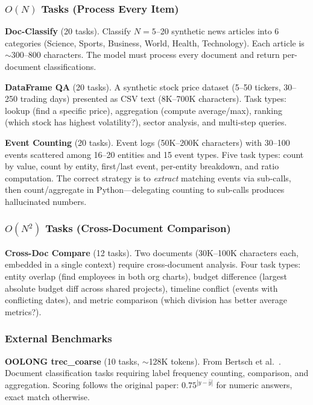 \documentclass{article}
\begin{document}
\subsubsection{$O(N)$ Tasks (Process Every Item)}

\textbf{Doc-Classify} (20 tasks). Classify $N{=}5$--20 synthetic news articles into 6 categories (Science, Sports, Business, World, Health, Technology). Each article is $\sim$300--800 characters. The model must process every document and return per-document classifications.

\textbf{DataFrame QA} (20 tasks). A synthetic stock price dataset (5--50 tickers, 30--250 trading days) presented as CSV text (8K--700K characters). Task types: lookup (find a specific price), aggregation (compute average/max), ranking (which stock has highest volatility?), sector analysis, and multi-step queries.

\textbf{Event Counting} (20 tasks). Event logs (50K--200K characters) with 30--100 events scattered among 16--20 entities and 15 event types. Five task types: count by value, count by entity, first/last event, per-entity breakdown, and ratio computation. The correct strategy is to \emph{extract} matching events via sub-calls, then count/aggregate in Python---delegating counting to sub-calls produces hallucinated numbers.

\subsubsection{$O(N^2)$ Tasks (Cross-Document Comparison)}

\textbf{Cross-Doc Compare} (12 tasks). Two documents (30K--100K characters each, embedded in a single context) require cross-document analysis. Four task types: entity overlap (find employees in both org charts), budget difference (largest absolute budget diff across shared projects), timeline conflict (events with conflicting dates), and metric comparison (which division has better average metrics?).

\subsubsection{External Benchmarks}

\textbf{OOLONG trec\_coarse} (10 tasks, $\sim$128K tokens). From Bertsch et al.~\cite{oolong2025}. Document classification tasks requiring label frequency counting, comparison, and aggregation. Scoring follows the original paper: $0.75^{|y - \hat{y}|}$ for numeric answers, exact match otherwise.
\end{document}
